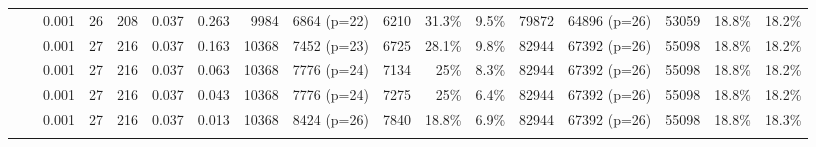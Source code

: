 \begin{landscape}
\begin{table}[p]
\begin{tabular}{|l|rrrrrrrrrrrrrrrr|}
		\cline{1-17}
		\multirow{12}{*}{\rotatebox{90}{aircraft}}
		& \color{red}{0.30} & 0.001 & 26 & 208 & 0.037 & 0.263 & 9984 & 6864 (p=22) & 6210 & 31.3\% & 9.5\% & 79872 & 64896 (p=26) & 53059 & 18.8\% & 18.2\% \\
		
		& \color{red}{0.20} & 0.001 & 27 & 216 & 0.037 & 0.163 & 10368 & 7452 (p=23) & 6725 & 28.1\% & 9.8\% & 82944 & 67392 (p=26) & 55098 & 18.8\% & 18.2\% \\
		
		& \color{red}{0.10} & 0.001 & 27 & 216 & 0.037 & 0.063 & 10368 & 7776 (p=24) & 7134 & 25\% & 8.3\% & 82944 & 67392 (p=26) & 55098 & 18.8\% & 18.2\% \\
		
		& \color{red}{0.08} & 0.001 & 27 & 216 & 0.037 & 0.043 & 10368 & 7776 (p=24) & 7275 & 25\% & 6.4\% & 82944 & 67392 (p=26) & 55098 & 18.8\% & 18.2\% \\
		
		& \color{red}{0.05} & 0.001 & 27 & 216 & 0.037 & 0.013 & 10368 & 8424 (p=26) & 7840 & 18.8\% & 6.9\% & 82944 & 67392 (p=26) & 55098 & 18.8\% & 18.3\% \\
		
		& & & & & & & & & & & & & & & & \\
		

\end{tabular}
\end{table}
\end{landscape}
